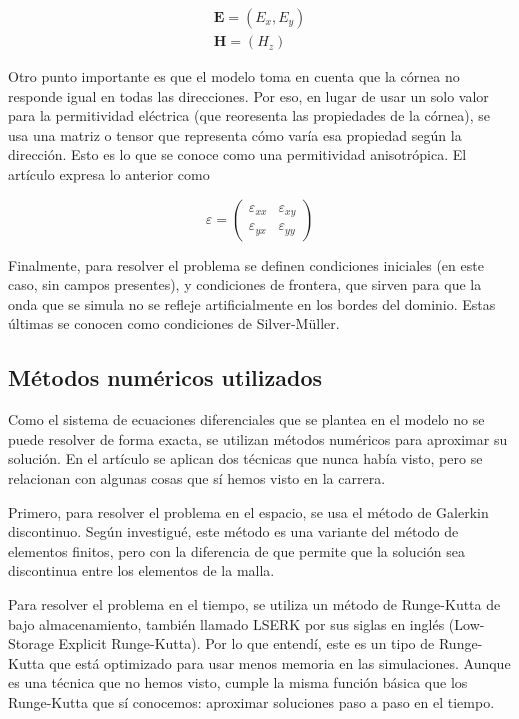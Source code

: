 \documentclass[10pt,a4paper]{article}
\begin{document}
\[
\begin{aligned}
\mathbf{E}=(E_x,E_y)\\
\mathbf{H}=(H_z)
\end{aligned}
\]

Otro punto importante es que el modelo toma en cuenta que la córnea no responde igual en todas las direcciones. Por eso, en lugar de usar un solo valor para la permitividad eléctrica (que reoresenta las propiedades de la córnea), se usa una matriz o tensor que representa cómo varía esa propiedad según la dirección. Esto es lo que se conoce como una permitividad anisotrópica. El artículo expresa lo anterior como 

\[
\varepsilon =
\begin{pmatrix}
\varepsilon_{xx} & \varepsilon_{xy} \\
\varepsilon_{yx} & \varepsilon_{yy}
\end{pmatrix}
\]

Finalmente, para resolver el problema se definen condiciones iniciales (en este caso, sin campos presentes), y condiciones de frontera, que sirven para que la onda que se simula no se refleje artificialmente en los bordes del dominio. Estas últimas se conocen como condiciones de Silver-Müller.

\subsection{Métodos numéricos utilizados}

Como el sistema de ecuaciones diferenciales que se plantea en el modelo no se puede resolver de forma exacta, se utilizan métodos numéricos para aproximar su solución. En el artículo se aplican dos técnicas que nunca había visto, pero se relacionan con algunas cosas que sí hemos visto en la carrera.

Primero, para resolver el problema en el espacio, se usa el método de Galerkin discontinuo. Según investigué, este método es una variante del método de elementos finitos, pero con la diferencia de que permite que la solución sea discontinua entre los elementos de la malla. 

Para resolver el problema en el tiempo, se utiliza un método de Runge-Kutta de bajo almacenamiento, también llamado LSERK por sus siglas en inglés (Low-Storage Explicit Runge-Kutta). Por lo que entendí, este es un tipo de Runge-Kutta que está optimizado para usar menos memoria en las simulaciones. Aunque es una técnica que no hemos visto, cumple la misma función básica que los Runge-Kutta que sí conocemos: aproximar soluciones paso a paso en el tiempo.
\end{document}
